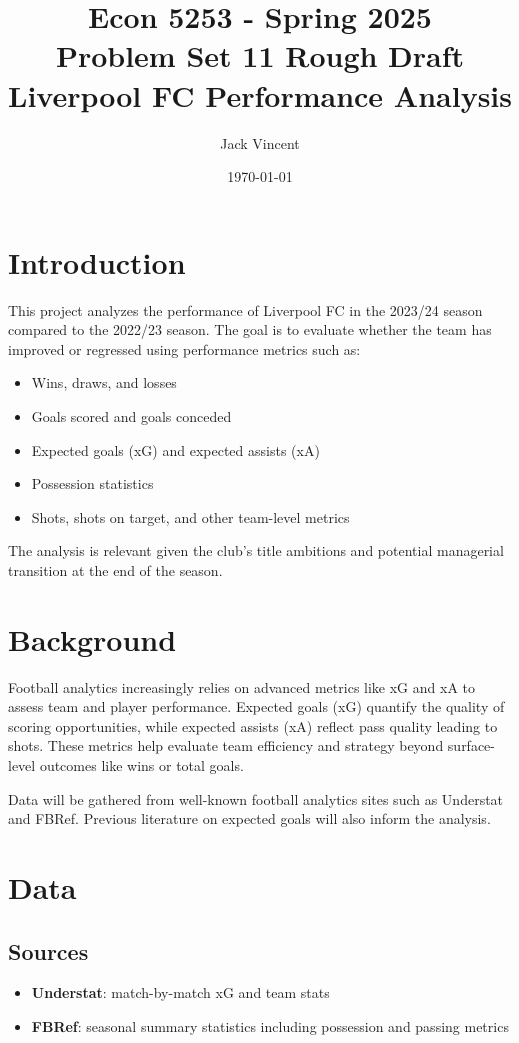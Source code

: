 \documentclass[12pt]{article}
\title{Econ 5253 - Spring 2025\\Problem Set 11 Rough Draft\\Liverpool FC Performance Analysis}
\author{Jack Vincent}
\date{\today}
\begin{document}
\maketitle

\section{Introduction}
This project analyzes the performance of Liverpool FC in the 2023/24 season compared to the 2022/23 season. The goal is to evaluate whether the team has improved or regressed using performance metrics such as:
\begin{itemize}
    \item Wins, draws, and losses
    \item Goals scored and goals conceded
    \item Expected goals (xG) and expected assists (xA)
    \item Possession statistics
    \item Shots, shots on target, and other team-level metrics
\end{itemize}
The analysis is relevant given the club's title ambitions and potential managerial transition at the end of the season.

\section{Background}
Football analytics increasingly relies on advanced metrics like xG and xA to assess team and player performance. Expected goals (xG) quantify the quality of scoring opportunities, while expected assists (xA) reflect pass quality leading to shots. These metrics help evaluate team efficiency and strategy beyond surface-level outcomes like wins or total goals.

Data will be gathered from well-known football analytics sites such as Understat and FBRef\citep{understat, fbref}. Previous literature on expected goals will also inform the analysis\citep{mackenzie2012}.

\section{Data}
\subsection*{Sources}
\begin{itemize}
    \item \textbf{Understat}: match-by-match xG and team stats
    \item \textbf{FBRef}: seasonal summary statistics including possession and passing metrics
\end{itemize}
\end{document}

